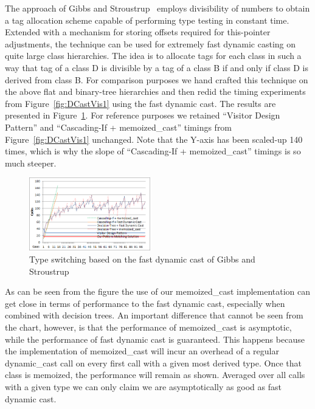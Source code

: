 \documentclass[preprint]{sigplanconf}
\begin{document}
The approach of Gibbs and Stroustrup~\cite{FastDynCast} employs divisibility of numbers to obtain a 
tag allocation scheme capable of performing type testing in constant time. 
Extended with a mechanism for storing offsets required for this-pointer 
adjustments, the technique can be used for extremely fast dynamic casting on 
quite large class hierarchies. The idea is to allocate tags 
for each class in such a way that tag of a class D is divisible by a tag of a 
class B if and only if class D is derived from class B. For comparison purposes 
we hand crafted this technique on the above flat and binary-tree hierarchies and 
then redid the timing experiments from Figure~\ref{fig:DCastVis1} using the fast 
dynamic cast. The results are presented in Figure~\ref{fig:DCastVis2}. For 
reference purposes we retained ``Visitor Design Pattern'' and ``Cascading-If + 
memoized\_cast'' timings from Figure~\ref{fig:DCastVis1} unchanged. Note that 
the Y-axis has been scaled-up 140 times, which is why the slope of 
``Cascading-If + memoized\_cast'' timings is so much steeper.

\begin{figure}[htbp]
  \centering
    \includegraphics[width=0.47\textwidth]{DCast-vs-Visitors2.png}
  \caption{Type switching based on the fast dynamic cast of Gibbs and Stroustrup~\cite{FastDynCast}}
  \label{fig:DCastVis2}
\end{figure}

As can be seen from the figure the use of our memoized\_cast implementation can 
get close in terms of performance to the fast dynamic cast, especially 
when combined with decision trees. An important difference that cannot be seen 
from the chart, however, is that the performance of memoized\_cast is 
asymptotic, while the performance of fast dynamic cast is guaranteed. This 
happens because the implementation of memoized\_cast will incur an overhead of 
a regular dynamic\_cast call on every first call with a given most derived type. 
Once that class is memoized, the performance will remain as shown. Averaged over 
all calls with a given type we can only claim we are asymptotically as good as 
fast dynamic cast.
\end{document}
